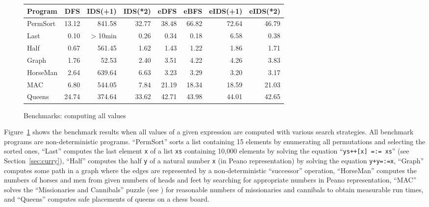 \documentclass[english]{lni}
\newcommand{\code}[1]{\texttt{\small{}#1}}
\newcommand{\ccode}[1]{``\code{#1}''}
\begin{document}
\begin{figure}[ht]
\centering
\begin{tabular}{|@{~~}l@{~~}|*{7}{@{~~}r@{~~}|}}
\hline
Program  &   DFS  & IDS(+1)& IDS(*2)&  eDFS  &  eBFS  &eIDS(+1)&eIDS(*2)\\
\hline
PermSort &  13.12 & 841.58 &  32.77 &  38.48 &  66.82 &  72.64 &  46.79 \\
Last     &   0.10 & $>$10min &   0.26 &   0.34 &   0.18 &   6.58 &   0.38 \\
Half     &   0.67 & 561.45 &   1.62 &   1.43 &   1.22 &   1.86 &   1.71 \\
Graph    &   1.76 &  52.53 &   2.40 &   3.51 &   4.22 &   4.26 &   3.83 \\
HorseMan &   2.64 & 639.64 &   6.63 &   3.23 &   3.29 &   3.20 &   3.17 \\
MAC      &   6.80 & 544.05 &   7.84 &  21.19 &  18.34 &  18.59 &  21.03 \\
Queens   &  24.74 & 374.64 &  33.62 &  42.71 &  43.98 &  44.01 &  42.65 \\
\hline
\end{tabular}
\caption{Benchmarks: computing all values}
\label{fig:bench-all-solutions}
\end{figure}

Figure~\ref{fig:bench-all-solutions} shows the benchmark results
when all values of a given expression are computed
with various search strategies.
All benchmark programs are non-deterministic programs.
``PermSort'' sorts a list containing 15 elements by enumerating
all permutations and selecting the sorted ones,
``Last'' computes the last element \code{x}
of a list \code{xs} containing 10,000 elements
by solving the equation \ccode{ys++[x] =:= xs}
(see Section~\ref{sec:curry}),
``Half'' computes the half \code{y} of a natural number \code{x}
(in Peano representation) by solving the equation \code{y+y=:=x},
``Graph'' computes some path in a graph where the edges
are represented by a non-deterministic ``successor'' operation,
``HorseMan'' computes the numbers of horses and men
from given numbers of heads and feet by searching for
appropriate numbers in Peano representation,
``MAC'' solves the ``Missionaries and Cannibals'' puzzle
(see \cite[Sect.~3.1]{AntoyHanus02FLOPS})
for reasonable numbers of missionaries and cannibals
to obtain measurable run times,
and ``Queens'' computes safe placements of queens on a chess board.
\end{document}
